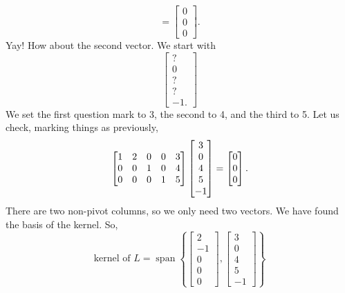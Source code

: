 \documentclass{ximera}
\begin{document}
\begin{example}
\begin{equation*}
        =
        \begin{bmatrix}
            0 \\ 
            0 \\ 
            0
        \end{bmatrix}
        .
    \end{equation*}
    Yay!  How about the second vector.  We start with
    \begin{equation*}
    \begin{bmatrix}
        ? \\ 
        0 \\ 
        ? \\ 
        ? \\ 
        -1 .
    \end{bmatrix}
    \end{equation*}
    We set the first question mark to 3, the second to 4, and the third to 5.  Let us check, marking things as previously,
    \begin{equation*}
        \begin{bmatrix}
            1 & 2 & 0 & 0 & 3 \\
            0 & 0 & 1 & 0 & 4 \\
            0 & 0 & 0 & 1 & 5
        \end{bmatrix} 
        \begin{bmatrix}
            3 \\ 
            0 \\ 
            4 \\ 
            5 \\ 
            -1
        \end{bmatrix}
        =
        \begin{bmatrix}
            0 \\ 
            0 \\ 
            0
        \end{bmatrix}
        .
    \end{equation*}
    There are two non-pivot columns, so we only need two vectors. We have found the basis of the kernel.  So,
    \begin{equation*}
        \text{kernel of $L$} =
        \operatorname{span} 
        \left\{
            \begin{bmatrix}
                2 \\ 
                -1 \\ 
                0 \\ 
                0 \\ 
                0
            \end{bmatrix}
            ,
            \begin{bmatrix}
                3 \\ 
                0 \\ 
                4 \\ 
                5 \\ 
                -1
            \end{bmatrix}
        \right\}
    \end{equation*}
\end{example}
\end{document}
